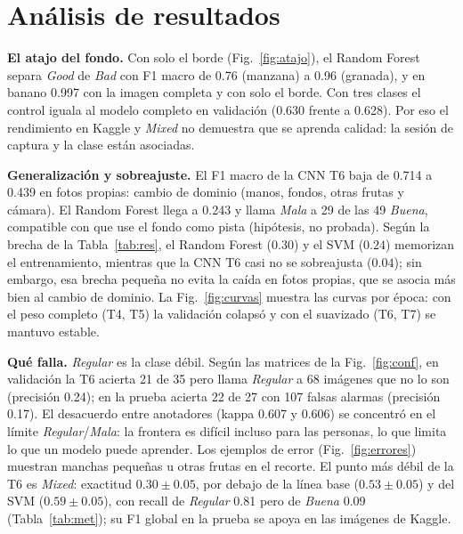 \documentclass[conference]{IEEEtran}
\begin{document}
\section{An\'alisis de resultados}
\textbf{El atajo del fondo.} Con solo el borde (Fig.~\ref{fig:atajo}), el Random Forest separa \emph{Good} de \emph{Bad} con F1 macro de 0.76 (manzana) a 0.96 (granada), y en banano 0.997 con la imagen completa y con solo el borde. Con tres clases el control iguala al modelo completo en validaci\'on (0.630 frente a 0.628). Por eso el rendimiento en Kaggle y \emph{Mixed} no demuestra que se aprenda calidad: la sesi\'on de captura y la clase est\'an asociadas.

\textbf{Generalizaci\'on y sobreajuste.} El F1 macro de la CNN T6 baja de 0.714 a 0.439 en fotos propias: cambio de dominio (manos, fondos, otras frutas y c\'amara). El Random Forest llega a 0.243 y llama \emph{Mala} a 29 de las 49 \emph{Buena}, compatible con que use el fondo como pista (hip\'otesis, no probada). Seg\'un la brecha de la Tabla~\ref{tab:res}, el Random Forest ($0.30$) y el SVM ($0.24$) memorizan el entrenamiento, mientras que la CNN T6 casi no se sobreajusta ($0.04$); sin embargo, esa brecha peque\~na no evita la ca\'ida en fotos propias, que se asocia m\'as bien al cambio de dominio. La Fig.~\ref{fig:curvas} muestra las curvas por \'epoca: con el peso completo (T4, T5) la validaci\'on colaps\'o y con el suavizado (T6, T7) se mantuvo estable.

\textbf{Qu\'e falla.} \emph{Regular} es la clase d\'ebil. Seg\'un las matrices de la Fig.~\ref{fig:conf}, en validaci\'on la T6 acierta 21 de 35 pero llama \emph{Regular} a 68 im\'agenes que no lo son (precisi\'on 0.24); en la prueba acierta 22 de 27 con 107 falsas alarmas (precisi\'on 0.17). El desacuerdo entre anotadores (kappa 0.607 y 0.606) se concentr\'o en el l\'imite \emph{Regular}/\emph{Mala}: la frontera es dif\'icil incluso para las personas, lo que limita lo que un modelo puede aprender. Los ejemplos de error (Fig.~\ref{fig:errores}) muestran manchas peque\~nas u otras frutas en el recorte. El punto m\'as d\'ebil de la T6 es \emph{Mixed}: exactitud $0.30\pm0.05$, por debajo de la l\'inea base ($0.53\pm0.05$) y del SVM ($0.59\pm0.05$), con recall de \emph{Regular} 0.81 pero de \emph{Buena} 0.09 (Tabla~\ref{tab:met}); su F1 global en la prueba se apoya en las im\'agenes de Kaggle.
\end{document}
